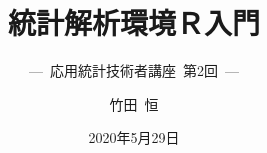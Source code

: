 


\title[応用統計技術者講座~第2回]{統計解析環境Ｒ入門}

\subtitle{---~応用統計技術者講座~第2回~---}

\author[\textcopyright~Hisashi Takeda]{竹田~恒}


\date{2020年5月29日}


%
%
\def\cs#1{\footnotesize{>\hspace{2mm}\textcolor{blue}{\texttt{#1}}}} %
\def\R{\textbf{R}}
\def\RStudio{\textbf{RStudio}}
\def\Excel{\textbf{Excel}}

\def\myffr{ \begin{frame}[fragile]{\thesection.\thesubsection 【\insertsection】\insertsubsection} }

\def\myfto{\end{frame}}

\def\mysffr{ \begin{frame}[fragile]{\thesection. \insertsection} }

\def\mybfr #1{\begin{block}{#1}}
\def\mybto {\end{block}}

\def\myefr #1{ \begin{exampleblock}{#1} }
\def\myeto { \end{exampleblock} }

\def\myb #1#2{\mybfr{#1}#2\mybto}
\def\mye #1#2{\myefr{#1}#2\myeto}

\def\mybb #1#2#3#4{
  \begin{minipage}{0.45\hsize}\mybfr{#1}#2\mybto\end{minipage}\hspace{3mm}
  \begin{minipage}{0.45\hsize}\mybfr{#3}#4\mybto\end{minipage}
}

